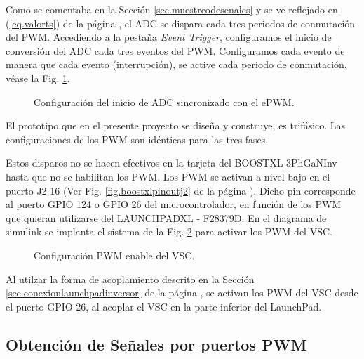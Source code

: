\documentclass{report}
\begin{document}
Como se comentaba en la Sección \ref{sec.muestreodesenales} y se ve reflejado en  (\ref{eq.valorts}) de la página \pageref{eq.valorts}, el ADC se dispara cada tres periodos de conmutación del PWM. Accediendo a la pestaña \textit{Event Trigger}, configuramos el inicio de conversión del ADC cada tres eventos del PWM. Configuramos cada evento de manera que cada evento (interrupción), se active cada periodo de conmutación, véase la Fig. \ref{fig.configuracionpwmeventtrigger}.


\begin{figure}[!h]
    \begin{center}
    \caption{Configuración del inicio de ADC sincronizado con el ePWM.}
    \label{fig.configuracionpwmeventtrigger} 
    \end{center}
\end{figure}

El prototipo que en el presente proyecto se diseña y construye, es trifásico. Las configuraciones de los PWM son idénticas para las tres fases. 
\clearpage

Estos disparos no se hacen efectivos en la tarjeta del BOOSTXL-3PhGaNInv hasta que no se habilitan los PWM. Los PWM se activan a nivel bajo en el puerto J2-16 (Ver Fig. \ref{fig.boostxlpinoutj2} de la página \pageref{fig.boostxlpinoutj2}). Dicho pin corresponde al puerto GPIO 124 o GPIO 26 del microcontrolador, en función de los PWM que quieran utilizarse del LAUNCHPADXL - F28379D. En el diagrama de simulink se implanta el sistema de la Fig. \ref{fig.pwmenable} para activar los PWM del VSC.

\begin{figure}[!h]
    \begin{center}
    \caption{Configuración PWM enable del VSC.}
    \label{fig.pwmenable} 
    \end{center}
\end{figure}
Al utilzar la forma de acoplamiento descrito en la Sección \ref{sec.conexionlaunchpadinversor} de la página \pageref{sec.conexionlaunchpadinversor}, se activan los PWM del VSC desde el puerto GPIO 26, al acoplar el VSC en la parte inferior del LaunchPad.


\subsection{Obtención de Señales por puertos PWM} \label{sec.salidaporpwm}
\end{document}
